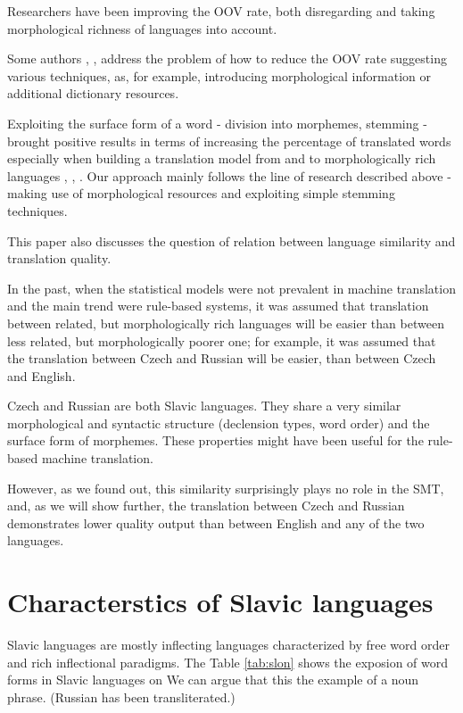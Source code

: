 \documentclass[11pt,letterpaper]{article}
\begin{document}
Researchers have been improving the OOV rate, both disregarding and taking morphological richness of languages into account.

Some authors \cite{habash}, \cite{turchi}, \cite{bojartamchyna} address the problem of how to reduce the OOV 
rate suggesting
various techniques, as, for example, introducing morphological information or additional dictionary
resources. 

Exploiting the surface form of a word - division into morphemes, stemming - brought
positive results in terms of increasing the percentage of translated words 
especially when building a translation  model from and to morphologically rich languages \cite{popovic},
\cite{oflazer}, \cite{gispert}.  
Our approach mainly follows the line of research described above - making use of 
morphological resources and exploiting simple stemming techniques.

This paper also discusses the question of relation between language similarity and translation quality.

In the past, when the statistical models were not prevalent in machine translation and the main trend were rule-based systems, it was assumed that translation between related, but morphologically rich languages will be easier than between less related, but morphologically poorer one; for example, it was assumed that the translation between Czech and Russian will be easier, than between Czech and English.

Czech and Russian are both Slavic languages. They share a very similar morphological and syntactic
structure (declension types, word order) and the surface form of morphemes. These properties 
might have been useful for the rule-based machine translation. 

However, as we found out, this similarity surprisingly
 plays no role in the SMT, and, as we will show further,
the translation between Czech and Russian demonstrates lower quality output than 
between English and any of the two languages.

\section{Characterstics of Slavic languages}
Slavic languages are mostly inflecting languages characterized by free word order and rich
inflectional paradigms. %
The Table \ref{tab:slon} shows the exposion of word forms in Slavic languages on
We can argue that this 
the example of a noun phrase. (Russian has been transliterated.)
\end{document}
